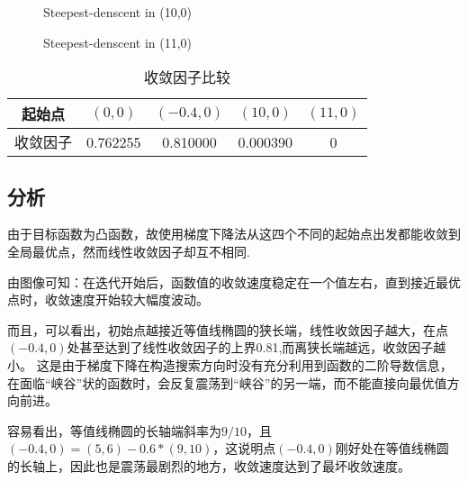 \begin{figure}[H]
\centering
{}
\caption{Steepest-denscent in (10,0)}
\label{Fig.lable}
\end{figure}

\begin{figure}[H]
\centering
{}

\caption{Steepest-denscent in (11,0)}
\label{Fig.lable}
\end{figure}

\begin{table}[H]
\centering
\caption{收敛因子比较}
	\begin{tabular}{ccccc}
	\toprule
	{起始点}&$(0,0)$&$(-0.4,0)$&$(10,0)$&$(11,0)$\\
	\midrule
	{收敛因子}&0.762255&0.810000&0.000390&0\\
	\bottomrule
	\end{tabular}
\end{table}

\newpage
\subsection{分析}
由于目标函数为凸函数，故使用梯度下降法从这四个不同的起始点出发都能收敛到全局最优点，然而线性收敛因子却互不相同.

由图像可知：在迭代开始后，函数值的收敛速度稳定在一个值左右，直到接近最优点时，收敛速度开始较大幅度波动。

而且，可以看出，初始点越接近等值线椭圆的狭长端，线性收敛因子越大，在点$(-0.4,0)$处甚至达到了线性收敛因子的上界0.81,而离狭长端越远，收敛因子越小。
这是由于梯度下降在构造搜索方向时没有充分利用到函数的二阶导数信息，在面临“峡谷”状的函数时，会反复震荡到“峡谷”的另一端，而不能直接向最优值方向前进。

容易看出，等值线椭圆的长轴端斜率为$9/10$，且$(-0.4,0)=(5,6)-0.6*(9,10)$，这说明点$(-0.4,0)$刚好处在等值线椭圆的长轴上，因此也是震荡最剧烈的地方，收敛速度达到了最坏收敛速度。